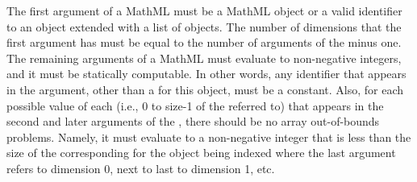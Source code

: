 The first argument of a MathML  must be a MathML  object or a valid identifier to an \SBase object extended with a list of \Dimension objects.   The number of dimensions that the first argument has must be equal to the number of arguments of the  minus one. The remaining arguments of a MathML  must evaluate to non-negative integers, and it must be statically computable.   In other words, any identifier that appears in the argument, other than a \Dimension {} for this object, must be a constant.   Also, for each possible value of each \Dimension {}  (i.e., 0 to size-1 of the \Dimension referred to) that appears in the second and later arguments of the , there should be no array out-of-bounds problems.  
Namely, it must evaluate to a non-negative integer that is less than the size of the corresponding \Dimension for the object being indexed where the last argument refers to dimension 0, next to last to dimension 1, etc.

